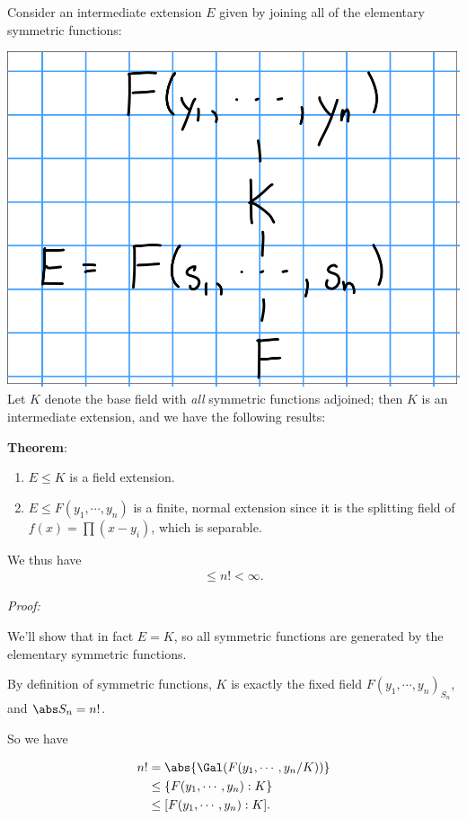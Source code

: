 Consider an intermediate extension \(E\) given by joining all of the
elementary symmetric functions:

\includegraphics{figures/2019-10-17-09:56.png}\\

Let \(K\) denote the base field with \emph{all} symmetric functions
adjoined; then \(K\) is an intermediate extension, and we have the
following results:

\textbf{Theorem}:

\begin{enumerate}
\def\labelenumi{\arabic{enumi}.}
\item
  \(E \leq K\) is a field extension.
\item
  \(E \leq F(y_1, \cdots, y_n)\) is a finite, normal extension since it
  is the splitting field of \(f(x) = \prod (x-y_i)\), which is
  separable.
\end{enumerate}

We thus have
\begin{align*}
[F(y_1, \cdots, y_n): E] \leq n! < \infty
.\end{align*}

\emph{Proof:}

We'll show that in fact \(E = K\), so all symmetric functions are
generated by the elementary symmetric functions.

By definition of symmetric functions, \(K\) is exactly the fixed field
\(F(y_1, \cdots, y_n)_{S_n}\), and \(\abs S_n = n!\).

So we have

\begin{align*}
n! &= \abs{ \Gal(F(y_1, \cdots, y_n / K))} \\
& \leq \{F(y_1, \cdots, y_n) : K\} \\
& \leq [F(y_1, \cdots, y_n): K]
.\end{align*}

